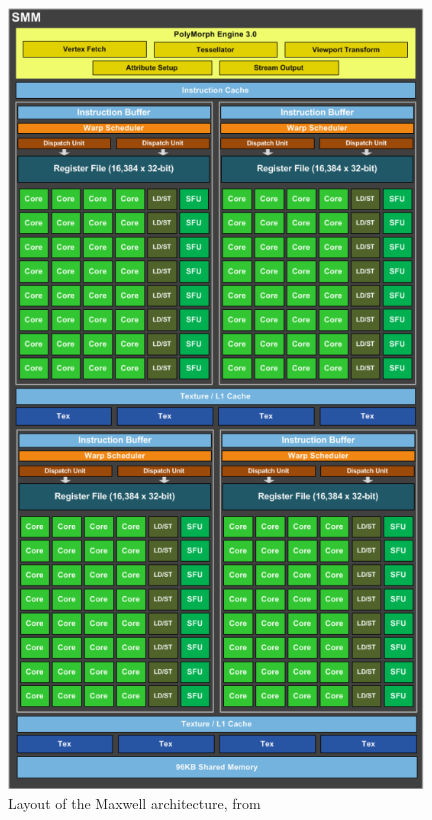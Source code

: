 \documentclass[10pt,a4paper]{report}
\begin{document}
\begin{figure}[h]
    \centering
    \includegraphics[width=11cm]{gpu_scheme.png}
    \caption{Layout of the Maxwell architecture, from \cite{nvidia_maxwell}}
    \label{fig:gpu_scheme}
\end{figure}
\end{document}
